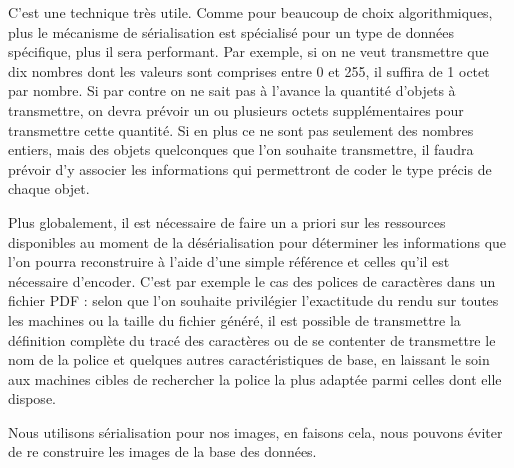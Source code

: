 C'est une technique très utile. Comme pour beaucoup de choix algorithmiques, plus le mécanisme de sérialisation est spécialisé pour un type de données spécifique, plus il sera performant. Par exemple, si on ne veut transmettre que dix nombres dont les valeurs sont comprises entre 0 et 255, il suffira de 1 octet par nombre. Si par contre on ne sait pas à l'avance la quantité d'objets à transmettre, on devra prévoir un ou plusieurs octets supplémentaires pour transmettre cette quantité. Si en plus ce ne sont pas seulement des nombres entiers, mais des objets quelconques que l'on souhaite transmettre, il faudra prévoir d'y associer les informations qui permettront de coder le type précis de chaque objet.

Plus globalement, il est nécessaire de faire un a priori sur les ressources disponibles au moment de la désérialisation pour déterminer les informations que l'on pourra reconstruire à l'aide d'une simple référence et celles qu'il est nécessaire d'encoder. C'est par exemple le cas des polices de caractères dans un fichier PDF : selon que l'on souhaite privilégier l'exactitude du rendu sur toutes les machines ou la taille du fichier généré, il est possible de transmettre la définition complète du tracé des caractères ou de se contenter de transmettre le nom de la police et quelques autres caractéristiques de base, en laissant le soin aux machines cibles de rechercher la police la plus adaptée parmi celles dont elle dispose.

Nous utilisons sérialisation pour nos images, en faisons cela, nous pouvons éviter de re construire les images de la base des données.




